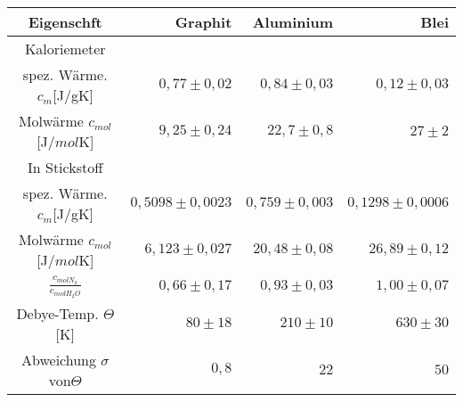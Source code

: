 \begin{table}[h!]
    \centering
    \begin{tabular}{c|r r r}
        \toprule
        Eigenschft & Graphit & Aluminium & Blei \\
        \midrule
        Kaloriemeter \\
        spez. Wärme. $c_m$[J/gK] & $ 0,77 \pm 0,02$ & $0,84 \pm 0,03$ & $0,12 \pm 0,03$ \\
        Molwärme    $c_{mol}$[J/$mol$K] &$ 9,25\pm 0,24$ & $22,7 \pm 0,8$ & $27 \pm2 $\\
        \midrule
        In Stickstoff \\
        spez. Wärme. $c_m$[J/gK] &$ 0,5098 \pm 0,0023 $& $0,759 \pm 0,003 $& $0,1298 \pm 0,0006 $\\
        Molwärme   $c_{mol}$[J/$mol$K]& $6,123 \pm 0,027$& $20,48 \pm 0,08$&$ 26,89 \pm 0,12$\\
        \midrule
        $\frac{c_{molN_2}}{c_{molH_2O}}$ &$0,66 \pm 0,17 $& $0,93 \pm 0,03$ &$ 1,00 \pm 0,07$\\
        Debye-Temp. $\Theta$[K] & $80 \pm 18$ & $210 \pm 10$ & $630 \pm 30$\\
        Abweichung $\sigma$ von$\Theta$  & $0,8$ & $22$ & $50$ \\

        
    \end{tabular}
\end{table}
\newpage
\clearpage
\newpage
\clearpage
\newpage
